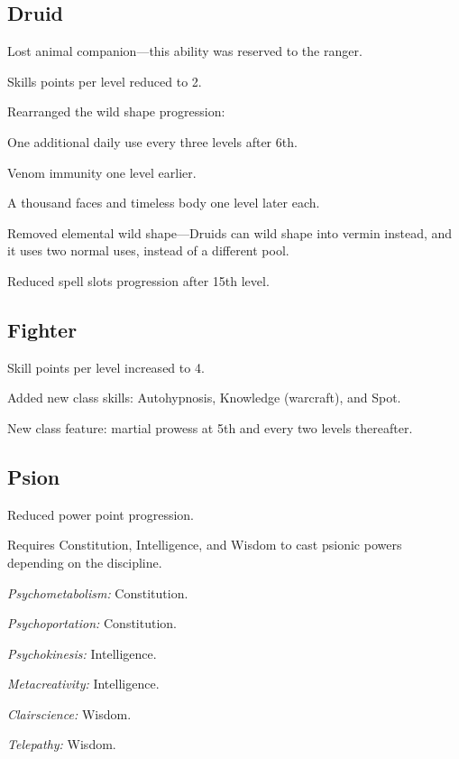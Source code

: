 \subsection{Druid}
\begin{itemize*}
\item Lost animal companion---this ability was reserved to the ranger.
\item Skills points per level reduced to 2.
\item Rearranged the wild shape progression:
	\begin{itemize*}
	\item One additional daily use every three levels after 6th.
	\item Venom immunity one level earlier.
	\item A thousand faces and timeless body one level later each.
	\end{itemize*}
\item Removed elemental wild shape---Druids can wild shape into vermin instead, and it uses two normal uses, instead of a different pool.
\item Reduced spell slots progression after 15th level.
\end{itemize*}

\subsection{Fighter}
\begin{itemize*}
\item Skill points per level increased to 4.
\item Added new class skills: Autohypnosis, Knowledge (warcraft), and Spot.
\item New class feature: martial prowess at 5th and every two levels thereafter.
\end{itemize*}

\subsection{Psion}
\begin{itemize*}
\item Reduced power point progression.
\item Requires Constitution, Intelligence, and Wisdom to cast psionic powers depending on the discipline.
	\begin{itemize*}
	\item \textit{Psychometabolism:} Constitution.
	\item \textit{Psychoportation:} Constitution.
	\item \textit{Psychokinesis:} Intelligence.
	\item \textit{Metacreativity:} Intelligence.
	\item \textit{Clairscience:} Wisdom.
	\item \textit{Telepathy:} Wisdom.
	\end{itemize*}
\end{itemize*}

